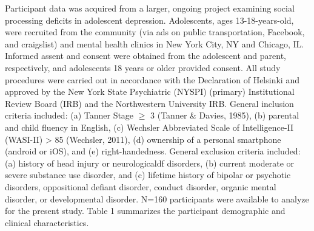\documentclass[
  man]{apa7}
\begin{document}
Participant data was acquired from a larger, ongoing project examining social processing deficits in adolescent depression. Adolescents, ages 13-18-years-old, were recruited from the community (via ads on public transportation, Facebook, and craigslist) and mental health clinics in New York City, NY and Chicago, IL. Informed assent and consent were obtained from the adolescent and parent, respectively, and adolescents 18 years or older provided consent. All study procedures were carried out in accordance with the Declaration of Helsinki and approved by the New York State Psychiatric (NYSPI) (primary) Institutional Review Board (IRB) and the Northwestern University IRB. General inclusion criteria included: (a) Tanner Stage \(\ge\) 3 (Tanner \& Davies, 1985), (b) parental and child fluency in English, (c) Wechsler Abbreviated Scale of Intelligence-II (WASI-II) \textgreater{} 85 (Wechsler, 2011), (d) ownership of a personal smartphone (android or iOS), and (e) right-handedness. General exclusion criteria included: (a) history of head injury or neurologicaldf disorders, (b) current moderate or severe substance use disorder, and (c) lifetime history of bipolar or psychotic disorders, oppositional defiant disorder, conduct disorder, organic mental disorder, or developmental disorder. N=160 participants were available to analyze for the present study. Table 1 summarizes the participant demographic and clinical characteristics.
\end{document}

